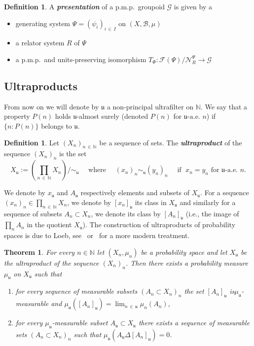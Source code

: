 \documentclass[10pt]{amsart}
\newtheorem{theo}[cdrthm]{Theorem}
\theoremstyle{definition}
\newtheorem{defi}[cdrthm]{Definition}
\newcommand{\defin}[1]{\textbf{\emph{#1}}}
\newcommand{\Nmath}{\mathbb{N}}
\newcommand{\cn}{\mathcal{N}}
\newcommand{\cg}{\mathcal{G}}
\newcommand{\cf}{\mathcal{F}}
\newcommand{\rb}{\mathscr{B}}
\newcommand{\ul}{\mathfrak{u}}
\newcommand{\ulae}{\mathfrak{u}\textrm{-a.e. }n}
\newcommand{\pmp}{p.m.p.\ }
\begin{document}
\begin{defi}
A \defin{presentation} of a \pmp groupoid $\cg$ is given by a
\begin{itemize}
\item[--] generating system $\Psi=(\psi_i)_{i\,\in\,I}$ on $(X,\rb, \mu)$
\item[--] a relator system $R$ of $\Psi$
\item[--] a \pmp and units-preserving isomorphism $T_\Phi: \cf(\Psi)/\cn_R^{\Psi}\rightarrow \cg$
\end{itemize}
\end{defi}



\subsection{Ultraproducts}

From now on we will denote by $\ul$ a non-principal ultrafilter on $\Nmath$. We say that a property $P(n)$ holds $\ul$-almost surely (denoted $P(n)$ for $\ulae$) if $\{n : P(n)\}$ belongs to $\ul$.
\begin{defi}
Let $(X_n)_{n\,\in\,\Nmath}$ be a sequence of sets. The
\defin{ultraproduct} of the sequence $(X_n)_n$ is the set
\[
X_\ul:=\left(\prod_{n\,\in\,\Nmath} X_n\right)/\sim_\ul\quad\text{ where }\quad (x_n)_n \sim_\ul (y_n)_n\quad \text{ if }\; x_{n}= y_{n}\text{ for }\ulae.
\]
\end{defi}

We denote by $x_\ul$ and $A_\ul$ respectively elements and subsets of $X_\ul$. For a sequence $(x_n)_n\in \prod_{n\,\in\,\Nmath} X_n$, we denote by $[x_n]_\ul$ its class in $X_\ul$ and similarly for a sequence of subsets $A_n\subset X_n$, we denote its class by $[A_n]_\ul$ (i.e., the image of $\prod_n A_n$ in the quotient $X_\ul$). The construction of ultraproducts of probability spaces is due to Loeb, see~\cite{CKTD} or~\cite{Card-ultra-prod-we-sofic-arxiv} for a more modern treatment.

\begin{theo}\label{thm:ultraproduct_measure_space}
For every $n\in\Nmath$ let $(X_n,\mu_n)$ be a probability space and let $X_\ul$ be the ultraproduct of the sequence $(X_n)_n$. Then there exists a probability measure $\mu_\ul$ on $X_\ul$ such that
\begin{enumerate}
\item \label{theo2.29.1} for every sequence of measurable subsets $(A_n\subset X_n)_n$ the set $[A_n]_\ul$ is\linebreak$\mu_\ul$-measurable and $\mu_\ul([A_n]_\ul)=\lim_{n\,\in\,\ul}\mu_n(A_n)$,
\item\label{item:measurable_subsets_in_ultraproducts}
for every $\mu_\ul$-measurable subset $A_\ul\subset X_\ul$ there exists a sequence of measurable sets $(A_n\subset X_n)_n$ such that $\mu_\ul(A_\ul\Delta [A_n]_\ul)=0$.
\end{enumerate}
\end{theo}
\end{document}

